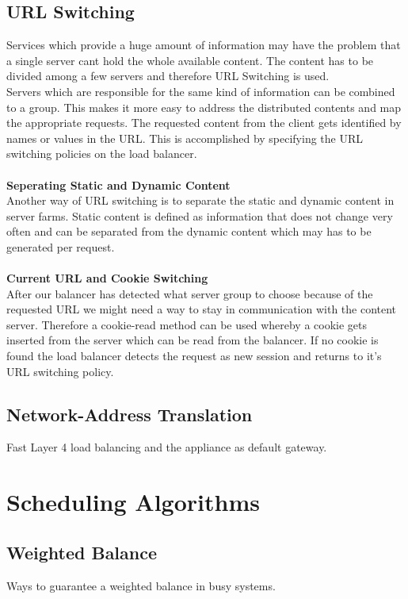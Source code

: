 \documentclass[12p]{article}
\begin{document}
	\subsection{URL Switching}
	Services which provide a huge amount of information may have the problem that a single server cant hold the whole available content. The content has to be divided among a few servers and therefore URL Switching is used.\\
	Servers which are responsible for the same kind of information can be combined to a group. This makes it more easy to address the distributed contents and map the appropriate requests.
	The requested content from the client gets identified by names or values in the URL. This is accomplished by specifying the URL switching policies on the load balancer.\\
	\\
	\textbf{Seperating Static and Dynamic Content}\\
	Another way of URL switching is to separate the static and dynamic content in server farms. Static content is defined as information that does not change very often and can be separated from the dynamic content which may has to be generated per request.\\
	\\
	\textbf{Current URL and Cookie Switching}\\
	After our balancer has detected what server group to choose because of the requested URL we might need a way to stay in communication with the content server. Therefore a cookie-read method can be used whereby a cookie gets inserted from the server which can be read from the balancer.
	If no cookie is found the load balancer detects the request as new session and returns to it's URL switching policy.
	
	\newpage
	\subsection{Network-Address Translation}
	Fast Layer 4 load balancing and the appliance as default gateway.
	
	\newpage
	\section{Scheduling Algorithms}
	\subsection{Weighted Balance}
	Ways to guarantee a weighted balance in busy systems.
\end{document}
